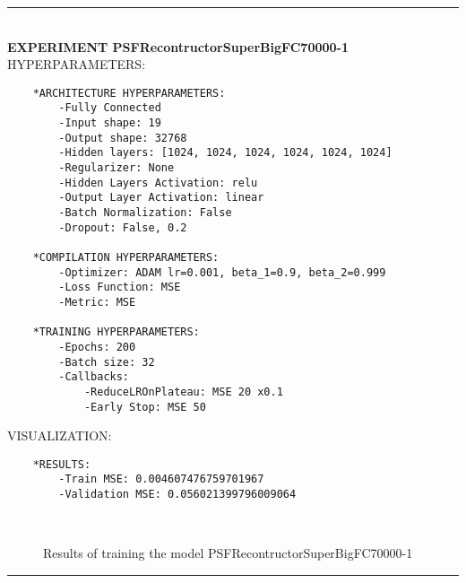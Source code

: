 \rule{0.5\textwidth}{0.5pt}\\

	{\large \textbf{EXPERIMENT PSFRecontructorSuperBigFC70000-1}}\\
	
	{\normalsize HYPERPARAMETERS:}
	\begin{lstlisting}
	*ARCHITECTURE HYPERPARAMETERS:
		-Fully Connected
		-Input shape: 19
		-Output shape: 32768
		-Hidden layers: [1024, 1024, 1024, 1024, 1024, 1024]
		-Regularizer: None
		-Hidden Layers Activation: relu
		-Output Layer Activation: linear
		-Batch Normalization: False
		-Dropout: False, 0.2
	
	*COMPILATION HYPERPARAMETERS:
		-Optimizer: ADAM lr=0.001, beta_1=0.9, beta_2=0.999
		-Loss Function: MSE
		-Metric: MSE
	
	*TRAINING HYPERPARAMETERS:
		-Epochs: 200
		-Batch size: 32
		-Callbacks: 
			-ReduceLROnPlateau: MSE 20 x0.1
			-Early Stop: MSE 50
	\end{lstlisting}
	
	{\normalsize VISUALIZATION:}
	\begin{lstlisting}
	*RESULTS:
        -Train MSE: 0.004607476759701967
        -Validation MSE: 0.056021399796009064
	\end{lstlisting}
	
	\begin{figure*}[ht!]
		\hspace{\fill}
		\hspace{\fill}
		\\
		\caption{Results of training the model PSFRecontructorSuperBigFC70000-1}
	\end{figure*}
	
\FloatBarrier	
\rule{0.5\textwidth}{0.5pt}\\